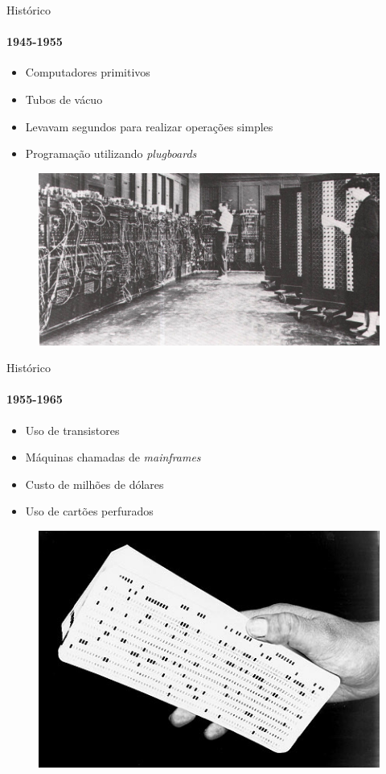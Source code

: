 \documentclass{beamer}
\begin{document}
\begin{frame}{Histórico}
	\framesubtitle{1945-1955}
	\begin{itemize}
		\item Computadores primitivos
		\item Tubos de vácuo
		\item Levavam segundos para realizar operações simples
		\item Programação utilizando \textit{plugboards}
	\end{itemize}
	\begin{figure}
		\includegraphics[width=0.5\paperwidth]{resources/eniac}
	\end{figure}
\end{frame}
\begin{frame}{Histórico}
	\framesubtitle{1955-1965}
	\begin{itemize}
		\item Uso de transistores
		\item Máquinas chamadas de \textit{mainframes}
		\item Custo de milhões de dólares
		\item Uso de cartões perfurados
	\end{itemize}
	\begin{figure}
		\includegraphics[width=0.5\paperwidth]{resources/punchcards}
	\end{figure}
\end{frame}
\end{document}
